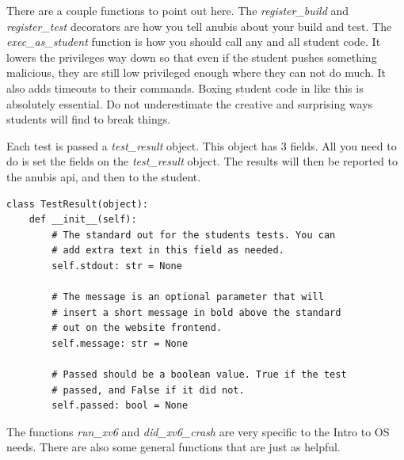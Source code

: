 There are a couple functions to point out here.
The \textit{register\_build} and \textit{register\_test} decorators are how
you tell anubis about your build and test.
The \textit{exec\_as\_student} function is how you should call any and all student code.
It lowers the privileges way down so that even if the student pushes something
malicious, they are still low privileged enough where they can not do much.
It also adds timeouts to their commands.
Boxing student code in like this is absolutely essential.
Do not underestimate the creative and surprising ways students will find to break things.

Each test is passed a \textit{test\_result} object.
This object has 3 fields.
All you need to do is set the fields on the \textit{test\_result} object.
The results will then be reported to the anubis api, and then to the student.

\begin{verbatim}
class TestResult(object):
    def __init__(self):
        # The standard out for the students tests. You can
        # add extra text in this field as needed.
        self.stdout: str = None

        # The message is an optional parameter that will
        # insert a short message in bold above the standard
        # out on the website frontend.
        self.message: str = None

        # Passed should be a boolean value. True if the test
        # passed, and False if it did not.
        self.passed: bool = None
\end{verbatim}

The functions \textit{run\_xv6} and \textit{did\_xv6\_crash} are very specific to the
Intro to OS needs.
There are also some general functions that are just as helpful.

